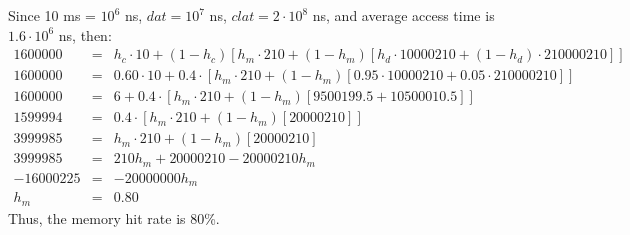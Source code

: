 \documentclass[letterpaper,11pt]{article}
\begin{document}
\begin{enumerate}
Since 10 ms = $10^6$ ns, $dat = 10^7$ ns, $clat = 2\cdot10^8$ ns, and average access time is $1.6\cdot10^6$ ns, then:
\begin{eqnarray*}
1600000 &=& h_c\cdot 10 + (1 - h_c)[h_m\cdot210 + (1 - h_m)[h_d\cdot10000210 + (1 - h_d)\cdot210000210]] \\
1600000 &=& 0.60\cdot 10 + 0.4\cdot[h_m\cdot210 + (1 - h_m)[0.95\cdot10000210 + 0.05\cdot210000210]] \\
1600000 &=& 6 + 0.4\cdot[h_m\cdot210 + (1 - h_m)[9500199.5 + 10500010.5]]  \\
1599994 &=& 0.4\cdot[h_m\cdot210 + (1 - h_m)[20000210]] \\
3999985 &=& h_m\cdot210 + (1 - h_m)[20000210] \\
3999985 &=& 210 h_m + 20000210 - 20000210 h_m \\
-16000225 &=& -20000000 h_m \\
h_m &=& 0.80
\end{eqnarray*}
Thus, the memory hit rate is 80\%.
\end{enumerate}
\end{document}
